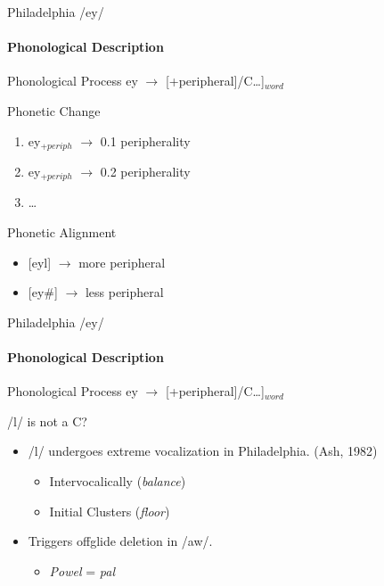 \documentclass[]{beamer}
\begin{document}
\begin{frame}{Philadelphia /ey/}
	\framesubtitle{Phonological Description}
	
	\begin{block}{Phonological Process}
		ey $\rightarrow$ [+peripheral]/\underline{\hskip 15pt}C\ldots]$_{word}$
	\end{block}
	
	\begin{block}{Phonetic Change}
		\begin{enumerate}
			\item ey$_{+periph}$ $\rightarrow$ 0.1 peripherality
			\item ey$_{+periph}$ $\rightarrow$ 0.2 peripherality
			\item \ldots
		\end{enumerate}
	\end{block}
	
	\begin{block}{Phonetic Alignment}
		\begin{itemize}
			\item {[}eyl] $\rightarrow$ more peripheral
			\item {[}ey\#] $\rightarrow$ less peripheral
		\end{itemize}
	\end{block}
\end{frame}

\begin{frame}{Philadelphia /ey/}
	\framesubtitle{Phonological Description}
	
	\begin{block}{Phonological Process}
		ey $\rightarrow$ [+peripheral]/\underline{\hskip 15pt}C\ldots]$_{word}$
	\end{block}
	\begin{block}{/l/ is not a C?}
		\begin{itemize}
			\item /l/ undergoes extreme vocalization in Philadelphia. (Ash, 1982)
				\begin{itemize}
					\item Intervocalically ({\it balance})
					\item Initial Clusters ({\it floor})
				\end{itemize}
			\item Triggers offglide deletion in /aw/.
				\begin{itemize}
					\item {\it Powel} = {\it pal}
				\end{itemize}
		\end{itemize}
		
	\end{block}
\end{frame}
\end{document}
